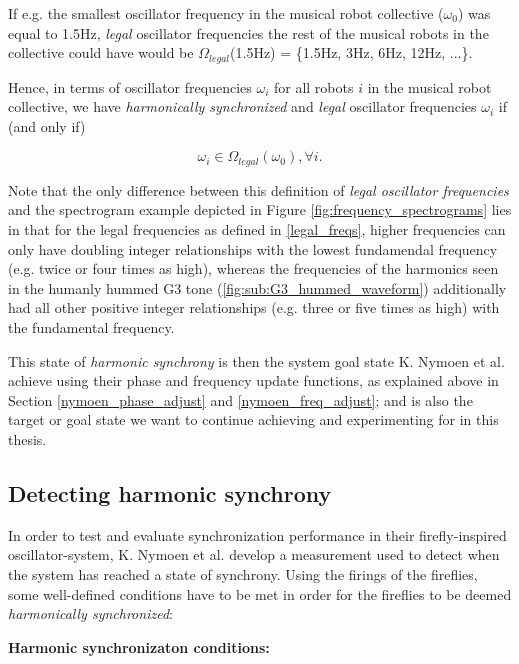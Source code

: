 If e.g. the smallest oscillator frequency in the musical robot collective ($\omega_0$) was equal to 1.5Hz, \textit{legal} oscillator frequencies the rest of the musical robots in the collective could have would be $\Omega_{legal}$(1.5Hz) = \{1.5Hz, 3Hz, 6Hz, 12Hz, ...\}.

Hence, in terms of oscillator frequencies $\omega_i$ for all robots $i$ in the musical robot collective, we have \textit{harmonically synchronized} and \textit{legal} oscillator frequencies $\omega_i$ if (and only if)

\begin{equation}\label{synced_freqs}
\omega_i \in \Omega_{legal}(\omega_0) , \forall i.
\end{equation} \nl

Note that the only difference between this definition of \textit{legal oscillator frequencies} and the spectrogram example depicted in Figure \ref{fig:frequency_spectrograms} lies in that for the legal frequencies as defined in \eqref{legal_freqs}, higher frequencies can only have doubling integer relationships with the lowest fundamendal frequency (e.g. twice or four times as high), whereas the frequencies of the harmonics seen in the humanly hummed G3 tone (\ref{fig:sub:G3_hummed_waveform}) additionally had all other positive integer relationships (e.g. three or five times as high) with the fundamental frequency.

This state of \textit{harmonic synchrony} is then the system goal state K. Nymoen et al. achieve using their phase and frequency update functions, as explained above in Section \ref{nymoen_phase_adjust} and \ref{nymoen_freq_adjust}; and is also the target or goal state we want to continue achieving and experimenting for in this thesis.


	\subsection{Detecting harmonic synchrony}
	\label{subsec:harmonic_synchrony}
	In order to test and evaluate synchronization performance in their firefly-inspired oscillator-system, K. Nymoen et al. \cite{nymoen_synch} develop a measurement used to detect when the system has reached a state of synchrony. Using the firings of the fireflies, some well-defined conditions have to be met in order for the fireflies to be deemed \textit{harmonically synchronized}: \nl
	
	\textbf{Harmonic synchronizaton conditions:}
	
